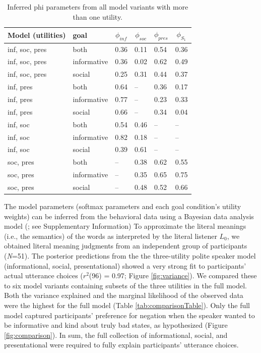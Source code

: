\documentclass[9pt,twocolumn,twoside,lineno]{main_class_file}
\begin{document}
\begin{table}[tbp]
\begin{center}
\begin{threeparttable}
\caption{\label{tab:phi}Inferred phi parameters from all model variants with more than one utility.}
\begin{tabularx}{\columnwidth}{llllll}
\toprule
Model (utilities) & \multicolumn{1}{l}{goal} & \multicolumn{1}{c}{$\phi_{inf}$} & \multicolumn{1}{c}{$\phi_{soc}$} & \multicolumn{1}{c}{$\phi_{pres}$} & \multicolumn{1}{c}{$\phi_{S_1}$}\\
\midrule
inf, soc, pres & both & 0.36 & 0.11 & 0.54 & 0.36\\
inf, soc, pres & informative & 0.36 & 0.02 & 0.62 & 0.49\\
inf, soc, pres & social & 0.25 & 0.31 & 0.44 & 0.37\\
inf, pres & both & 0.64 & -- & 0.36 & 0.17\\
inf, pres & informative & 0.77 & -- & 0.23 & 0.33\\
inf, pres & social & 0.66 & -- & 0.34 & 0.04\\
inf, soc & both & 0.54 & 0.46 & -- & --\\
inf, soc & informative & 0.82 & 0.18 & -- & --\\
inf, soc & social & 0.39 & 0.61 & -- & --\\
soc, pres & both & -- & 0.38 & 0.62 & 0.55\\
soc, pres & informative & -- & 0.35 & 0.65 & 0.75\\
soc, pres & social & -- & 0.48 & 0.52 & 0.66\\
\bottomrule
\end{tabularx}
\end{threeparttable}
\end{center}
\end{table}



The model parameters (softmax parameters and each goal condition's utility weights) can be inferred from the behavioral data using a Bayesian data analysis model (\cite{lee2014}; see Supplementary Information)
To approximate the literal meanings (i.e., the semantics) of the words as interpreted by the literal listener \(L_0\), we obtained literal meaning judgments from an independent group of participants
(\emph{N}=51).
The posterior predictions from the the three-utility polite speaker model (informational, social, presentational) showed a very strong fit to participants' actual utterance choices (\(r^2\)(96) = 0.97; Figure \ref{fig:variance}).
We compared these to six model variants containing
subsets of the three utilities in the full model.
Both the variance explained and the marginal likelihood of the observed data were the
highest for the full model (Table \ref{tab:comparisonTable}). Only the
full model captured participants' preference for negation when the speaker wanted to be informative and kind
about truly bad states, as hypothesized (Figure \ref{fig:comparison}).
In sum, the full collection of informational, social, and presentational were
required to fully explain participants' utterance choices.
\end{document}
